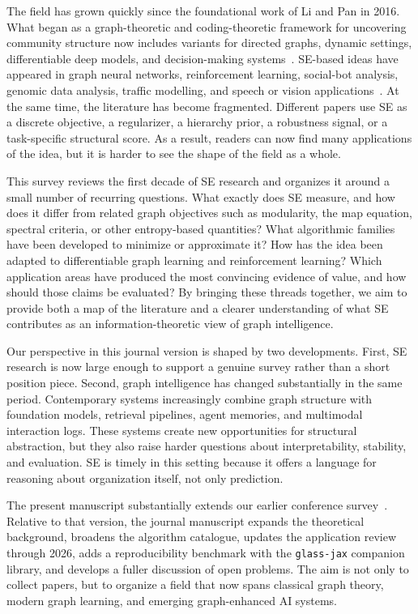 The field has grown quickly since the foundational work of Li and Pan in 2016.
What began as a graph-theoretic and coding-theoretic framework for uncovering
community structure now includes variants for directed graphs, dynamic
settings, differentiable deep models, and decision-making
systems~\cite{Li2016,pan2021information,sun2024lsenet,zeng2025sidmJMLR}.
SE-based ideas have appeared in graph neural networks, reinforcement learning,
social-bot analysis, genomic data analysis, traffic modelling, and speech or
vision applications~\cite{yang2024sebot,chen2022pyseat,zou2024transformer,wang2024secodecSpeech}.
At the same time, the literature has become fragmented.
Different papers use SE as a discrete objective, a regularizer, a hierarchy
prior, a robustness signal, or a task-specific structural score.
As a result, readers can now find many applications of the idea, but it is
harder to see the shape of the field as a whole.

This survey reviews the first decade of SE research and organizes it around a
small number of recurring questions.
What exactly does SE measure, and how does it differ from related graph
objectives such as modularity, the map equation, spectral criteria, or other
entropy-based quantities?
What algorithmic families have been developed to minimize or approximate it?
How has the idea been adapted to differentiable graph learning and
reinforcement learning?
Which application areas have produced the most convincing evidence of value,
and how should those claims be evaluated?
By bringing these threads together, we aim to provide both a map of the
literature and a clearer understanding of what SE contributes as an
information-theoretic view of graph intelligence.

Our perspective in this journal version is shaped by two developments.
First, SE research is now large enough to support a genuine survey rather than
a short position piece.
Second, graph intelligence has changed substantially in the same period.
Contemporary systems increasingly combine graph structure with foundation
models, retrieval pipelines, agent memories, and multimodal interaction logs.
These systems create new opportunities for structural abstraction, but they
also raise harder questions about interpretability, stability, and
evaluation.
SE is timely in this setting because it offers a language for reasoning about
organization itself, not only prediction.

The present manuscript substantially extends our earlier conference
survey~\cite{su2025ijcai}.
Relative to that version, the journal manuscript expands the theoretical
background, broadens the algorithm catalogue, updates the application review
through 2026, adds a reproducibility benchmark with the \texttt{glass-jax}
companion library, and develops a fuller discussion of open problems.
The aim is not only to collect papers, but to organize a field that now spans
classical graph theory, modern graph learning, and emerging graph-enhanced AI
systems.

